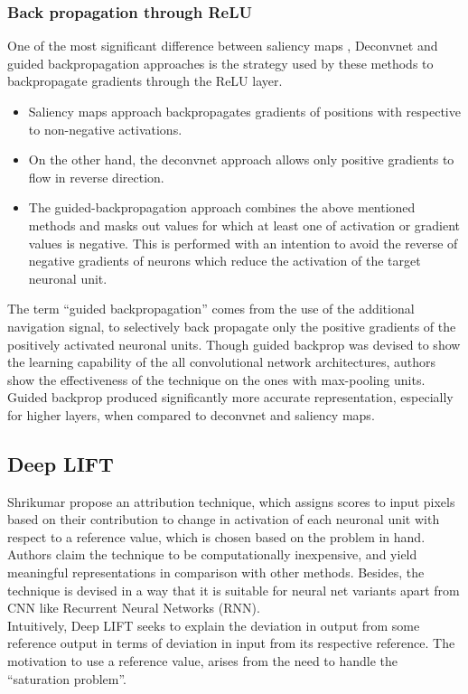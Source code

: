 \documentclass[../report.tex]{subfiles}
\begin{document}
 \subsubsection{Back propagation through ReLU}
 One of the most significant difference between saliency maps \cite{simonyan2013deep}, Deconvnet \cite{matthew2014visualizing} and guided backpropagation \cite{guided_backprop} approaches is the strategy used by these methods to backpropagate gradients through the ReLU layer. 
 
 \begin{itemize}
 	\item Saliency maps approach backpropagates gradients of positions with respective to non-negative activations.
 	\item On the other hand, the deconvnet approach allows only positive gradients to flow in reverse direction.
 	\item The guided-backpropagation approach combines the above mentioned methods and masks out values for which at least  one of activation or gradient values is negative. This is performed with an intention to avoid the reverse of negative gradients of neurons which reduce the activation of the target neuronal unit.
 \end{itemize}

The term \enquote{guided backpropagation} comes from the use of the additional navigation signal, to selectively back propagate only the positive gradients of the positively activated neuronal units. Though guided backprop was devised to show the learning capability of the all convolutional network architectures, authors show the effectiveness of the technique on the ones with max-pooling units. Guided backprop produced significantly more accurate representation, especially  for higher layers, when compared to deconvnet and saliency maps.

\subsection{Deep LIFT}
 Shrikumar \etal \cite{shrikumar2017learning} propose an attribution technique, which assigns scores to input pixels based on their contribution to change in activation of each neuronal unit with respect to a reference value, which is chosen based on the problem in hand. Authors claim the technique to be computationally inexpensive, and yield meaningful representations in comparison with other methods. Besides, the technique is devised in a way that it is suitable for neural net variants apart from CNN like Recurrent Neural Networks (RNN).\\
 Intuitively, Deep LIFT seeks to explain the deviation in output from some reference output in terms of deviation in input from its respective reference. The motivation to use a reference value, arises from the need to handle the \enquote{saturation problem}.
  
\end{document}
